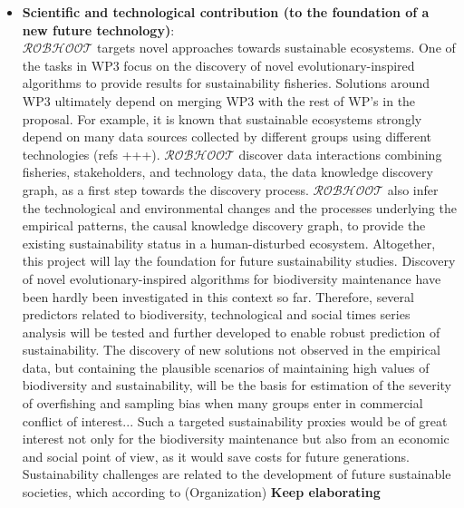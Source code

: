 \documentclass[11pt, a4paper]{article} %
\begin{document}
\begin{itemize}
\item {\bf Scientific and technological contribution (to the foundation of a new future technology)}:\\
  $\mathcal{ROBHOOT}$ targets novel approaches towards sustainable
  ecosystems. One of the tasks in WP3 focus on the discovery of novel
  evolutionary-inspired algorithms to provide results for
  sustainability fisheries. Solutions around WP3 ultimately depend on
  merging WP3 with the rest of WP's in the proposal. For example, it
  is known that sustainable ecosystems strongly depend on many data
  sources collected by different groups using different technologies
  (refs +++). $\mathcal{ROBHOOT}$ discover data interactions combining
  fisheries, stakeholders, and technology data, the data knowledge
  discovery graph, as a first step towards the discovery
  process. $\mathcal{ROBHOOT}$ also infer the technological and
  environmental changes and the processes underlying the empirical
  patterns, the causal knowledge discovery graph, to provide the
  existing sustainability status in a human-disturbed
  ecosystem. Altogether, this project will lay the foundation for
  future sustainability studies. Discovery of novel
  evolutionary-inspired algorithms for biodiversity maintenance have
  been hardly been investigated in this context so far. Therefore,
  several predictors related to biodiversity, technological and social
  times series analysis will be tested and further developed to enable
  robust prediction of sustainability. The discovery of new solutions
  not observed in the empirical data, but containing the plausible
  scenarios of maintaining high values of biodiversity and
  sustainability, will be the basis for estimation of the severity of
  overfishing and sampling bias when many groups enter in commercial
  conflict of interest... Such a targeted sustainability proxies would
  be of great interest not only for the biodiversity maintenance but
  also from an economic and social point of view, as it would save
  costs for future generations. Sustainability challenges are related
  to the development of future sustainable societies, which according
  to (Organization) {\bf Keep elaborating}
  

\end{itemize}
\end{document}
